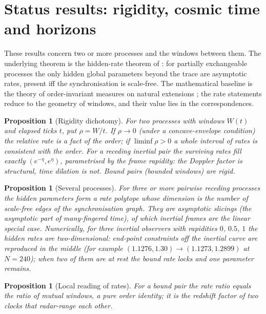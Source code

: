 \documentclass[11pt]{article}
\newtheorem{proposition}[theorem]{Proposition}
\theoremstyle{definition}
\theoremstyle{remark}
\begin{document}
\section{Status results: rigidity, cosmic time and horizons}\label{sec:status}

These results concern two or more processes and the windows between them. The underlying theorem is the hidden-rate theorem of \cite{pzfc}: for partially exchangeable processes the only hidden global parameters beyond the trace are asymptotic rates, present iff the synchronisation is scale-free. The mathematical baseline is the theory of order-invariant measures on natural extensions \cite{brightwellluczak}; the rate statements reduce to the geometry of windows, and their value lies in the correspondences.

\begin{proposition}[Rigidity dichotomy]\label{prop:rigid}
For two processes with windows $W(t)$ and elapsed ticks $t$, put $\rho=W/t$. If $\rho\to0$ (under a concave-envelope condition) the relative rate is a fact of the order; if $\liminf\rho>0$ a whole interval of rates is consistent with the order. For a receding inertial pair the surviving rates fill exactly $(e^{-\eta},e^{\eta})$, parametrised by the frame rapidity: the Doppler factor is structural, time dilation is not. Bound pairs (bounded windows) are rigid.
\end{proposition}

\begin{proposition}[Several processes]
For three or more pairwise receding processes the hidden parameters form a rate polytope whose dimension is the number of scale-free edges of the synchronisation graph. They are asymptotic slicings (the asymptotic part of many-fingered time), of which inertial frames are the linear special case. Numerically, for three inertial observers with rapidities $0$, $0.5$, $1$ the hidden rates are two-dimensional: end-point constraints off the inertial curve are reproduced in the middle (for example $(1.1276,1.30)\to(1.1273,1.2899)$ at $N=240$); when two of them are at rest the bound rate locks and one parameter remains.
\end{proposition}

\begin{proposition}[Local reading of rates]
For a bound pair the rate ratio equals the ratio of mutual windows, a pure order identity; it is the redshift factor of two clocks that radar-range each other.
\end{proposition}
\end{document}
